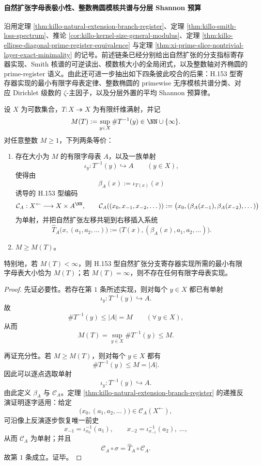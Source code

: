 \paragraph{自然扩张字母表极小性、整数椭圆模核共谱与分层 Shannon 预算}
沿用定理 \ref{thm:killo-natural-extension-branch-register}、定理
\ref{thm:killo-smith-loss-spectrum}、推论
\ref{cor:killo-kernel-size-general-modulus}、定理
\ref{thm:killo-ellipse-diagonal-prime-register-equivalence} 与定理
\ref{thm:xi-prime-slice-nontrivial-layer-exact-minimality} 的记号。前述链条已经分别给出自然扩张的分支指标寄存器实现、Smith 核谱的可逆读出、模数核大小的全局闭式，以及整数轴对齐椭圆的 prime-register 语义。由此还可进一步抽出如下四条彼此咬合的后果：H.153 型寄存器实现的最小有限字母表定律、整数椭圆的 primewise 无序模核共谱分类、对应 Dirichlet 级数的 \(\zeta\)-主因子，以及分层外置的平均 Shannon 预算律。

\begin{theorem}\label{thm:xi-natural-extension-h153-minimal-finite-alphabet}
设 \(X\) 为可数集合，\(T:X\twoheadrightarrow X\) 为有限纤维满射，并记
\[
M(T):=\sup_{y\in X}\#T^{-1}(y)\in \NN\cup\{\infty\}.
\]
对任意整数 \(M\ge 1\)，下列两条等价：
\begin{enumerate}
  \item 存在大小为 \(M\) 的有限字母表 \(A\)，以及一族单射
  \[
  \iota_y:T^{-1}(y)\hookrightarrow A\qquad(y\in X),
  \]
  使得由
  \[
  \beta_A(x):=\iota_{T(x)}(x)
  \]
  诱导的 H.153 型编码
  \[
  \mathcal C_A:X^{\leftarrow}\longrightarrow X\times A^{\NN},
  \qquad
  \mathcal C_A((x_0,x_{-1},x_{-2},\dots))
  :=
  \bigl(x_0,(\beta_A(x_{-1}),\beta_A(x_{-2}),\dots)\bigr)
  \]
  为单射，并把自然扩张左移共轭到右移插入系统
  \[
  \widehat T_A\bigl(x,(a_1,a_2,\dots)\bigr)
  :=
  \bigl(T(x),(\beta_A(x),a_1,a_2,\dots)\bigr).
  \]
  \item \(M\ge M(T)\)。
\end{enumerate}
特别地，若 \(M(T)<\infty\)，则 H.153 型自然扩张分支寄存器实现所需的最小有限字母表大小恰为 \(M(T)\)；若 \(M(T)=\infty\)，则不存在任何有限字母表实现。
\end{theorem}
\begin{proof}
先证必要性。若存在第 \(1\) 条所述实现，则对每个 \(y\in X\) 都已有单射
\[
\iota_y:T^{-1}(y)\hookrightarrow A.
\]
故
\[
\#T^{-1}(y)\le |A|=M
\qquad(\forall\,y\in X),
\]
从而
\[
M(T)=\sup_{y\in X}\#T^{-1}(y)\le M.
\]

再证充分性。若 \(M\ge M(T)\)，则对每个 \(y\in X\) 都有
\[
\#T^{-1}(y)\le M=|A|.
\]
因此可以逐点选取单射
\[
\iota_y:T^{-1}(y)\hookrightarrow A.
\]
由此定义 \(\beta_A\) 与 \(\mathcal C_A\)。定理 \ref{thm:killo-natural-extension-branch-register} 的递推反演证明逐字适用：给定
\[
\bigl(x_0,(a_1,a_2,\dots)\bigr)\in \mathcal C_A(X^{\leftarrow}),
\]
可沿像上反演逐步恢复唯一前史
\[
x_{-1}=\iota_{x_0}^{-1}(a_1),\qquad
x_{-2}=\iota_{x_{-1}}^{-1}(a_2),\ \dots,
\]
从而 \(\mathcal C_A\) 为单射；并且
\[
\mathcal C_A\circ \sigma=\widehat T_A\circ \mathcal C_A.
\]
故第 \(1\) 条成立。证毕。
\end{proof}

